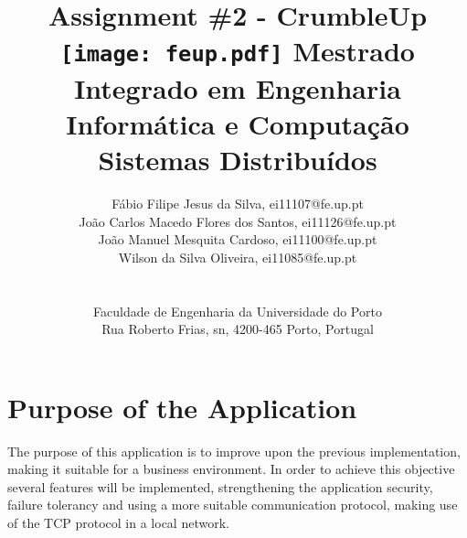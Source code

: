 \documentclass[a4paper]{article}
\begin{document}
\setlength{\textwidth}{16cm}
\setlength{\textheight}{22cm}

\title{\Huge\textbf{Assignment \#2 - CrumbleUp}\linebreak\linebreak\linebreak
\Large\textbf{}\linebreak\linebreak
\texttt{[image: feup.pdf]}\linebreak \linebreak
\Large{Mestrado Integrado em Engenharia Informática e Computação} \linebreak \linebreak
\Large{Sistemas Distribuídos}\linebreak
}

\author{ Fábio Filipe Jesus da Silva, ei11107@fe.up.pt \\  João Carlos Macedo Flores dos Santos, ei11126@fe.up.pt \\ João Manuel Mesquita Cardoso, ei11100@fe.up.pt \\
Wilson da Silva Oliveira, ei11085@fe.up.pt \\\linebreak\linebreak \\
 \\ Faculdade de Engenharia da Universidade do Porto \\ Rua Roberto Frias, s\/n, 4200-465 Porto, Portugal \linebreak\linebreak\linebreak
\linebreak\linebreak\vspace{1cm}}
\maketitle
\thispagestyle{empty}


\newpage

\section{Purpose of the Application}
The purpose of this application is to improve upon the previous implementation, making it suitable for a business environment.
In order to achieve this objective several features will be implemented, strengthening the application security, failure tolerancy and using a more suitable communication protocol, making use of the TCP protocol in a local network.
\end{document}

